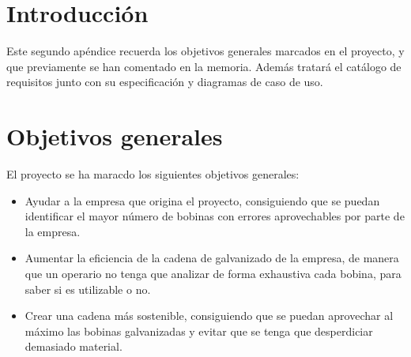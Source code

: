 
\section{Introducción}
Este segundo apéndice recuerda los objetivos generales marcados en el proyecto, y que previamente se han comentado en la memoria. Además tratará el catálogo de requisitos junto con su especificación y diagramas de caso de uso.

\section{Objetivos generales}
El proyecto se ha maracdo los siguientes objetivos generales:
\begin{itemize}
    \item Ayudar a la empresa que origina el proyecto, consiguiendo que se puedan identificar el mayor número de bobinas con errores aprovechables por parte de la empresa.
    \item Aumentar la eficiencia de la cadena de galvanizado de la empresa, de manera que un operario no tenga que analizar de forma exhaustiva cada bobina, para saber si es utilizable o no.
    \item Crear una cadena más sostenible, consiguiendo que se puedan aprovechar al máximo las bobinas galvanizadas y evitar que se tenga que desperdiciar demasiado material.   
\end{itemize}

